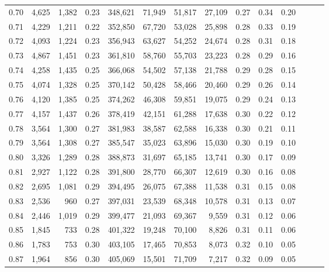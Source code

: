 \begin{tabular}{rrrrrrrrrrrrrr}
0.70 &   4,625 &  1,382 &  0.23 &  348,621 &   71,949 &  51,817 &  27,109 &  0.27 &  0.34 &      0.20 \\
0.71 &   4,229 &  1,211 &  0.22 &  352,850 &   67,720 &  53,028 &  25,898 &  0.28 &  0.33 &      0.19 \\
0.72 &   4,093 &  1,224 &  0.23 &  356,943 &   63,627 &  54,252 &  24,674 &  0.28 &  0.31 &      0.18 \\
0.73 &   4,867 &  1,451 &  0.23 &  361,810 &   58,760 &  55,703 &  23,223 &  0.28 &  0.29 &      0.16 \\
0.74 &   4,258 &  1,435 &  0.25 &  366,068 &   54,502 &  57,138 &  21,788 &  0.29 &  0.28 &      0.15 \\
0.75 &   4,074 &  1,328 &  0.25 &  370,142 &   50,428 &  58,466 &  20,460 &  0.29 &  0.26 &      0.14 \\
0.76 &   4,120 &  1,385 &  0.25 &  374,262 &   46,308 &  59,851 &  19,075 &  0.29 &  0.24 &      0.13 \\
0.77 &   4,157 &  1,437 &  0.26 &  378,419 &   42,151 &  61,288 &  17,638 &  0.30 &  0.22 &      0.12 \\
0.78 &   3,564 &  1,300 &  0.27 &  381,983 &   38,587 &  62,588 &  16,338 &  0.30 &  0.21 &      0.11 \\
0.79 &   3,564 &  1,308 &  0.27 &  385,547 &   35,023 &  63,896 &  15,030 &  0.30 &  0.19 &      0.10 \\
0.80 &   3,326 &  1,289 &  0.28 &  388,873 &   31,697 &  65,185 &  13,741 &  0.30 &  0.17 &      0.09 \\
0.81 &   2,927 &  1,122 &  0.28 &  391,800 &   28,770 &  66,307 &  12,619 &  0.30 &  0.16 &      0.08 \\
0.82 &   2,695 &  1,081 &  0.29 &  394,495 &   26,075 &  67,388 &  11,538 &  0.31 &  0.15 &      0.08 \\
0.83 &   2,536 &    960 &  0.27 &  397,031 &   23,539 &  68,348 &  10,578 &  0.31 &  0.13 &      0.07 \\
0.84 &   2,446 &  1,019 &  0.29 &  399,477 &   21,093 &  69,367 &   9,559 &  0.31 &  0.12 &      0.06 \\
0.85 &   1,845 &    733 &  0.28 &  401,322 &   19,248 &  70,100 &   8,826 &  0.31 &  0.11 &      0.06 \\
0.86 &   1,783 &    753 &  0.30 &  403,105 &   17,465 &  70,853 &   8,073 &  0.32 &  0.10 &      0.05 \\
0.87 &   1,964 &    856 &  0.30 &  405,069 &   15,501 &  71,709 &   7,217 &  0.32 &  0.09 &      0.05 \\

\end{tabular}
